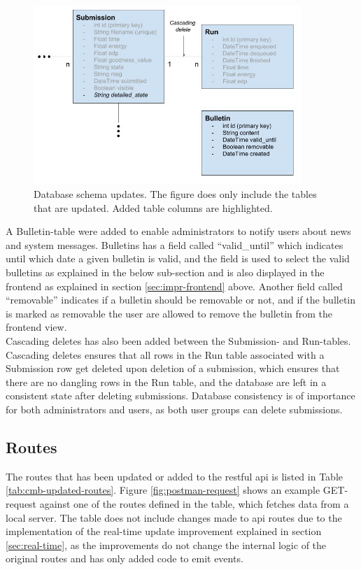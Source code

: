 \begin{figure}
    \includegraphics[width=0.9\textwidth]{figs/updated_database_schema.jpg}
    \caption[Database schema updates]{Database schema updates. The figure does only include the tables that are updated. Added table columns are highlighted. }
    \label{fig:updated-database-schema}
\end{figure}

A Bulletin-table were added to enable administrators to notify users about news and system messages. Bulletins has a field called ``valid\_until'' which indicates until which date a given bulletin is valid, and the field is used to select the valid bulletins as explained in the below sub-section and is also displayed in the frontend as explained in section \ref{sec:impr-frontend} above. Another field called ``removable'' indicates if a bulletin should be removable or not, and if the bulletin is marked as removable the user are allowed to remove the bulletin from the frontend view. \\

Cascading deletes has also been added between the Submission- and Run-tables. Cascading deletes ensures that all rows in the Run table associated with a Submission row get deleted upon deletion of a submission, which ensures that there are no dangling rows in the Run table, and the database are left in a consistent state after deleting submissions. Database consistency is of importance for both administrators and users, as both user groups can delete submissions.

\subsection{Routes}
The routes that has been updated or added to the \gls{rest}ful \gls{api} is listed in Table \ref{tab:cmb-updated-routes}. Figure \ref{fig:postman-request} shows an example GET-request against one of the routes defined in the table, which fetches data from a local server. The table does not include changes made to \gls{api} routes due to the implementation of the real-time update improvement explained in section \ref{sec:real-time}, as the improvements do not change the internal logic of the original routes and has only added code to emit events. \\


